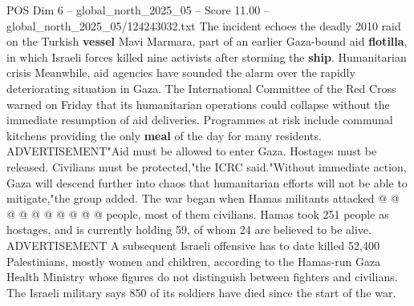 \begin{textsample}{POS Dim 6 – global\_north\_2025\_05 – Score 11.00 – global\_north\_2025\_05/124243032.txt}
The incident echoes the deadly 2010 raid on the Turkish \textbf{vessel} Mavi Marmara, part of an earlier Gaza-bound aid \textbf{flotilla}, in which Israeli forces killed nine activists after storming the \textbf{ship}.
Humanitarian crisis Meanwhile, aid agencies have sounded the alarm over the rapidly deteriorating situation in Gaza.
The International Committee of the Red Cross warned on Friday that its humanitarian operations could collapse without the immediate resumption of aid deliveries.
Programmes at risk include communal kitchens providing the only \textbf{meal} of the day for many residents.
ADVERTISEMENT"Aid must be allowed to enter Gaza.
Hostages must be released.
Civilians must be protected,"the ICRC said."Without immediate action, Gaza will descend further into chaos that humanitarian efforts will not be able to mitigate,"the group added.
The war began when Hamas militants attacked @ @ @ @ @ @ @ @ @ @ people, most of them civilians.
Hamas took 251 people as hostages, and is currently holding 59, of whom 24 are believed to be alive.
ADVERTISEMENT A subsequent Israeli offensive has to date killed 52,400 Palestinians, mostly women and children, according to the Hamas-run Gaza Health Ministry whose figures do not distinguish between fighters and civilians.
The Israeli military says 850 of its soldiers have died since the start of the war.

\end{textsample}
